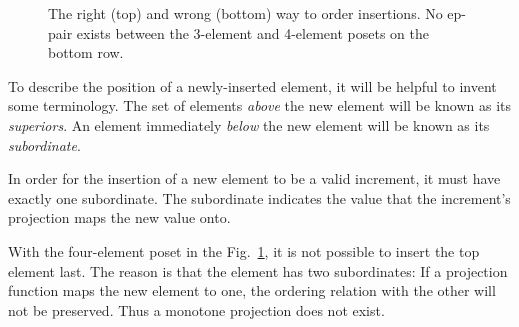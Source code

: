 \documentclass{llncs}
\begin{document}
\begin{figure}
\begin{center}
\end{center}
\caption{\label{fig:order} The right (top) and wrong (bottom) way to
  order insertions.  No ep-pair exists between the 3-element and
  4-element posets on the bottom row.}
\end{figure}

To describe the position of a newly-inserted element, it will be
helpful to invent some terminology.  The set of elements \emph{above}
the new element will be known as its \emph{superiors}.  An element
immediately \emph{below} the new element will be known as its
\emph{subordinate}.

In order for the insertion of a new element to be a valid increment,
it must have exactly one subordinate.  The subordinate indicates the value
that the increment's projection maps the new value onto.

With the four-element poset in the Fig.~\ref{fig:order}, it is not
possible to insert the top element last.  The reason is that the
element has two subordinates: If a projection function maps the new
element to one, the ordering relation with the other will not be
preserved.  Thus a monotone projection does not exist.
\end{document}
